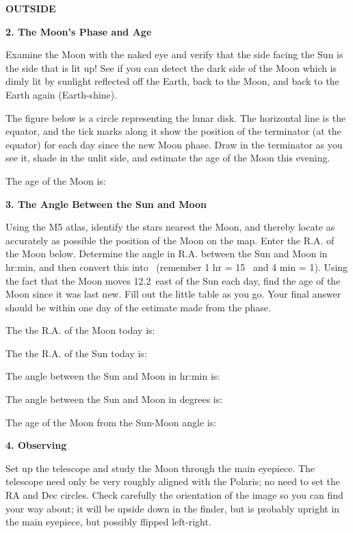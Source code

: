 \documentclass[12pt]{article}
\begin{document}
\bigskip
\noindent
{\bf OUTSIDE}

\bigskip
\noindent
{\bf 2. The Moon's Phase and Age}

\medskip\noindent 
Examine the Moon with the naked eye and verify that the side facing
the Sun is the side that is lit up! 
See if you can detect the dark side of the Moon
which is dimly lit by sunlight reflected off the Earth, back to the
Moon, and back to the Earth again (Earth-shine).

The figure below is a circle representing the lunar disk. The
horizontal line is the equator, and the tick marks along it show the
position of the terminator (at the equator) for each day since the new
Moon phase. Draw in the terminator as you see it, shade in the unlit
side, and estimate the age of the Moon this evening.
\medskip

{ \hfill The age of the Moon is: \makebox[2cm]{\hrulefill} }

\newpage

\bigskip
\noindent
{\bf 3. The Angle Between the Sun and Moon}

\medskip\noindent 
Using the M5 atlas, identify the stars nearest the Moon, and thereby locate as
accurately as possible the position of the Moon on the map.
Enter the R.A. of the Moon below. Determine the angle in R.A. between
the Sun and
Moon in hr:min, and then convert this into \deg\ (remember 1 hr = 15
\deg\, and 4 min = 1\deg). Using the fact that the Moon moves 12.2\deg\
east of the Sun each day, find the age of the Moon since it was last
new. Fill out the little table as you go. Your final answer should be
within one day of the estimate made from the phase.

\medskip
The the R.A. of the  Moon today is: \hfill \makebox[2cm]{\hrulefill} 

\medskip
The the R.A. of the  Sun today is: \hfill \makebox[2cm]{\hrulefill} 

\medskip
The angle between the Sun and Moon in hr:min is: \hfill \makebox[2cm]{\hrulefill} 

\medskip
The angle between the Sun and Moon in degrees is: \hfill
\makebox[2cm]{\hrulefill} 

\medskip
The age of the Moon from the Sun-Moon angle is: \hfill
\makebox[2cm]{\hrulefill} 
 
\bigskip
\medskip
\noindent
{\bf 4. Observing}

\medskip\noindent
Set up the telescope and study the Moon through the main eyepiece. The
telescope need only be very roughly aligned with the Polaris; no need
to set the RA and Dec circles. Check carefully the orientation of the
image so you can find your way about; it will be upside down in the
finder, but is probably upright in the main eyepiece, but possibly
flipped left-right.
\end{document}
